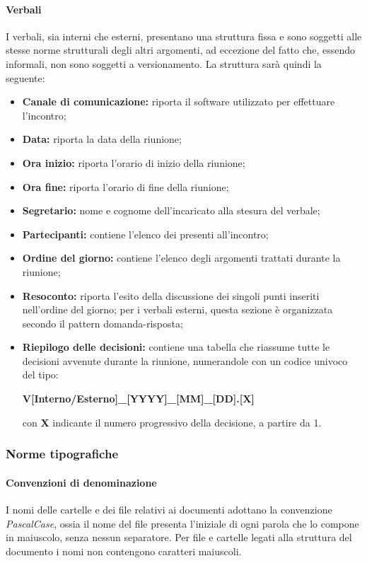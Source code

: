 \paragraph{Verbali}      
I verbali, sia interni che esterni, presentano una struttura fissa e sono soggetti alle stesse norme strutturali degli altri argomenti, ad eccezione del fatto che, essendo informali, non sono soggetti a versionamento.
La struttura sarà quindi la seguente:
\begin{itemize}
	\item \textbf{Canale di comunicazione:} riporta il software utilizzato per effettuare l'incontro;
	\item \textbf{Data:} riporta la data della riunione;
	\item \textbf{Ora inizio:} riporta l'orario di inizio della riunione;
	\item \textbf{Ora fine:} riporta l'orario di fine della riunione;
	\item \textbf{Segretario:} nome e cognome dell'incaricato alla stesura del verbale;
	\item \textbf{Partecipanti:} contiene l'elenco dei presenti all'incontro;   
	\item \textbf{Ordine del giorno:} contiene l'elenco degli argomenti trattati durante la riunione;
	\item \textbf{Resoconto:} riporta l'esito della discussione dei singoli punti inseriti nell'ordine del giorno; per i verbali esterni, questa sezione è organizzata secondo il pattern domanda-risposta;
	\item \textbf{Riepilogo delle decisioni:} contiene una tabella che riassume tutte le decisioni avvenute durante la riunione, numerandole con un codice univoco del tipo: \newline 
	\centerline{\textbf{V[Interno/Esterno]\_[YYYY]\_[MM]\_[DD].[X]}}\newline con \textbf{X} indicante il numero progressivo della decisione, a partire da 1.
\end{itemize}
\subsubsection{Norme tipografiche}
\paragraph{Convenzioni di denominazione}   
I nomi delle cartelle e dei file relativi ai documenti adottano la convenzione \textit{PascalCase}, ossia il nome del file presenta l'iniziale di ogni parola che lo compone in maiuscolo, senza nessun separatore. Per file e cartelle legati alla struttura del documento i nomi non contengono caratteri maiuscoli.
